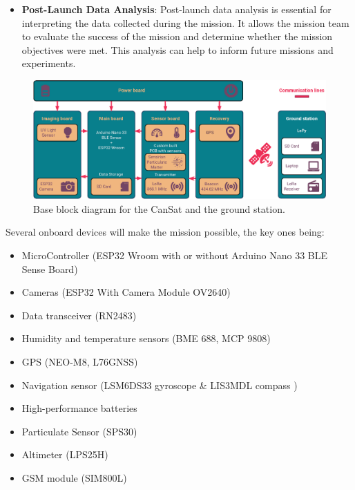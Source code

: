 \documentclass[11pt]{article}
\begin{document}
\begin{itemize}[leftmargin=1.27cm, itemindent=0cm, topsep=2pt, label=\faTasks]
    \item[\faChartBar] \textbf{Post-Launch Data Analysis}: Post-launch data analysis is essential for interpreting the data collected during the mission. It allows the mission team to evaluate the success of the mission and determine whether the mission objectives were met. This analysis can help to inform future missions and experiments. 
\end{itemize}

%  

\begin{figure}[htbp]
\centering
\includegraphics[width=\linewidth]{img_Block_Diagram_2023.eps}
\caption{\small{Base block diagram for the CanSat and the ground station.}}
\label{fig:bloc_diagrame}
\end{figure}

Several onboard devices will make the mission possible, the key ones being:
    \begin{multicols}{2}[\vspace{-0.5\baselineskip}]
        \begin{itemize}[leftmargin=1.75cm,itemindent=0cm, noitemsep, topsep=2pt, label=\faCheck]
            \item[\faMicrochip] MicroController (ESP32 Wroom with or without Arduino Nano 33 BLE Sense Board)
            \item[\faCamera] Cameras (ESP32 With Camera Module OV2640)
            \item[ \faWifi] Data transceiver (RN2483)
            \item[\faThermometerQuarter] Humidity and temperature sensors (BME 688, MCP 9808)
            \item[\faMapMarked] GPS (NEO-M8, L76GNSS)
            \item[\faCompass] Navigation sensor (LSM6DS33 gyroscope \& LIS3MDL compass )
            \item[\faBatteryHalf] High-performance batteries
            \item[\faCloudversify] Particulate Sensor (SPS30)
            \item[\newaltitudeicon] Altimeter (LPS25H)
            \item[\newgsmicon] GSM module (SIM800L)
        \end{itemize}
        \vspace*{-0.75\baselineskip}
    \end{multicols}
\end{document}
